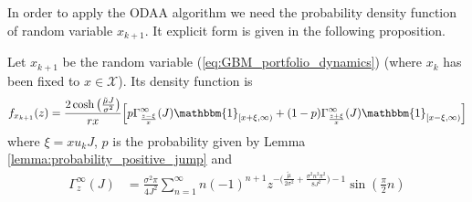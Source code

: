In order to apply the \gls{ODAA} algorithm we need the probability density function of random variable $x_{k+1}$. It explicit form is given in the following proposition.
\begin{proposition}
	Let $x_{k+1}$ be the random variable (\ref{eq:GBM_portfolio_dynamics}) (where $x_k$ has been fixed to $x \in \mathcal{X}$). Its density function is
	\begin{equation}
	f_{x_{k+1}}(z) = \frac{2\cosh\big(\frac{\tilde{\mu}J}{\sigma^2}\big)}{rx}\Big[p \Gamma^\infty_{\frac{z-\xi}{x}}(J) \mathbbm{1}_{[x+\xi,\infty)} + (1-p)\Gamma^\infty_{\frac{z+\xi}{x}}(J) \mathbbm{1}_{[x-\xi,\infty)}  \Big]
	\end{equation}
	where $\xi = xu_kJ$, $p$ is the probability given by Lemma \ref{lemma:probability_positive_jump} and
	\begin{align*}
	\Gamma^\infty_{z}(J) &=\frac{\sigma^2\pi}{4J^2}\sum_{n=1}^{\infty}n(-1)^{n+1}z^{-\big(\frac{\tilde{\mu}}{2\sigma^2} + \frac{\sigma^2n^2\pi^2}{8J^2}\big)-1}\sin(\frac{\pi}{2}n)
	\end{align*}
\end{proposition}

